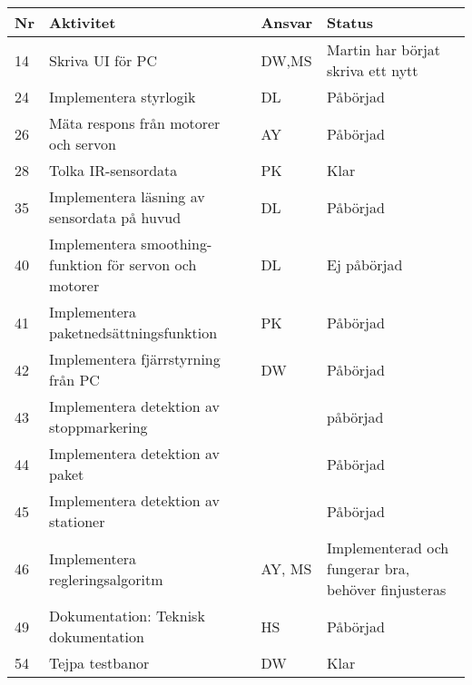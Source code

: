 \documentclass[titlepage, a4paper]{article}
\begin{document}
	\newpage
	\begin{center}
		\begin{tabularx}{\textwidth}{| p{4mm} | X | p{13.5mm} | X |}
			\hline
			\textbf{Nr} & \textbf{Aktivitet} & \textbf{Ansvar} & \textbf{Status} \\\hline
			{14} & {Skriva UI för PC} & {DW,MS} & {Martin har börjat skriva ett nytt} \\\hline
			{24} & {Implementera styrlogik} & {DL} & {Påbörjad} \\\hline
			{26} & {Mäta respons från motorer och servon} & {AY} & {Påbörjad} \\\hline
			{28} & {Tolka IR-sensordata} & {PK} & {Klar} \\\hline
			{35} & {Implementera läsning av sensordata på huvud} & {DL} & {Påbörjad} \\\hline
			{40} & {Implementera smoothing-funktion för servon och motorer} & {DL} & {Ej påbörjad} \\\hline
			{41} & {Implementera paketnedsättningsfunktion} & {PK} & {Påbörjad} \\\hline
			{42} & {Implementera fjärrstyrning från PC} & {DW} & {Påbörjad} \\\hline
			{43} & {Implementera detektion av stoppmarkering} & {} & {påbörjad} \\\hline
			{44} & {Implementera detektion av paket} & {} & {Påbörjad} \\\hline
			{45} & {Implementera detektion av stationer} & {} & {Påbörjad} \\\hline
			{46} & {Implementera regleringsalgoritm} & {AY, MS} & {Implementerad och fungerar bra, behöver finjusteras} \\\hline
			{49} & {Dokumentation: Teknisk dokumentation} & {HS} & {Påbörjad} \\\hline
			{54} & {Tejpa testbanor} & {DW} & {Klar} \\\hline
		\end{tabularx}
	\end{center}
\end{document}
